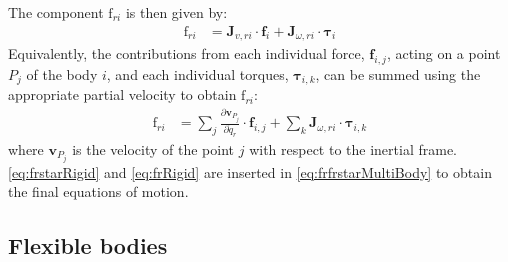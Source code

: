 \documentclass[wes, manuscript]{copernicus}
\renewcommand{\v}[1]{\boldsymbol{#1}}
\newcommand{\kanef}{\mathrm{f}}
\begin{document}
The component $\kanef_{ri}$ is then given by:
\begin{align}
   \kanef_{ri} &= \v{J}_{v,ri} \cdot \v{f}_i  + \v{J}_{\omega,ri} \cdot \v{\tau}_i
    \label{eq:frRigid}
\end{align}
Equivalently, the contributions from each individual force, $\v{f}_{i,j}$, acting on a point $P_j$ of the body $i$, and each individual torques, $\v{\tau}_{i,k}$, can be summed using the appropriate partial velocity to obtain $\kanef_{ri}$:
\begin{align}
   \kanef_{ri} &= \sum_j \frac{\partial \v{v}_{P_j}}{\partial \dot{q}_r} \cdot \v{f}_{i,j}  + \sum_k \v{J}_{\omega,ri} \cdot \v{\tau}_{i,k}
\end{align}
where $\v{v}_{P_j}$ is the velocity of the point $j$ with respect to the inertial frame.
\autoref{eq:frstarRigid} and \autoref{eq:frRigid}
are inserted in \autoref{eq:frfrstarMultiBody} to obtain the final equations of motion.


\subsection{Flexible bodies}
\label{sec:flexiblebodies}
\end{document}
